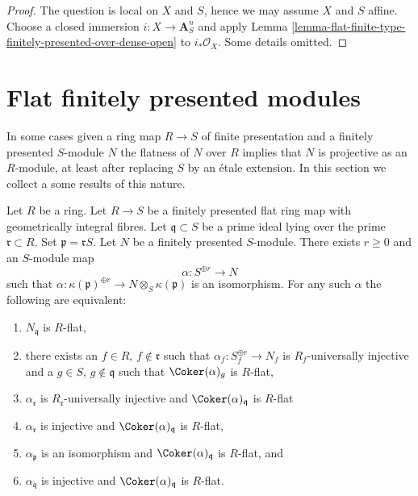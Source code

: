 \begin{proof}
The question is local on $X$ and $S$, hence we may assume $X$ and
$S$ affine. Choose a closed immersion $i : X \to \mathbf{A}^n_S$
and apply
Lemma \ref{lemma-flat-finite-type-finitely-presented-over-dense-open}
to $i_*\mathcal{O}_X$. Some details omitted.
\end{proof}





\section{Flat finitely presented modules}
\label{section-finitely-presented-flat}

\noindent
In some cases given a ring map $R \to S$ of finite presentation and
a finitely presented $S$-module $N$ the flatness of $N$ over $R$ implies
that $N$ is projective as an $R$-module, at least after replacing $S$
by an \'etale extension. In this section we collect a some results
of this nature.

\begin{lemma}
\label{lemma-induction-step-fp}
Let $R$ be a ring. Let $R \to S$ be a finitely presented
flat ring map with geometrically integral fibres. Let
$\mathfrak q \subset S$ be a prime ideal lying over the prime
$\mathfrak r \subset R$. Set $\mathfrak p = \mathfrak r S$.
Let $N$ be a finitely presented $S$-module.
There exists $r \geq 0$ and an $S$-module map
$$
\alpha : S^{\oplus r} \longrightarrow N
$$
such that
$\alpha : \kappa(\mathfrak p)^{\oplus r} \to N \otimes_S \kappa(\mathfrak p)$
is an isomorphism. For any such $\alpha$ the following are equivalent:
\begin{enumerate}
\item $N_{\mathfrak q}$ is $R$-flat,
\item there exists an $f \in R$, $f \not \in \mathfrak r$ such that
$\alpha_f : S_f^{\oplus r} \to N_f$ is $R_f$-universally injective and
a $g \in S$, $g \not \in \mathfrak q$ such that $\Coker(\alpha)_g$
is $R$-flat,
\item $\alpha_{\mathfrak r}$ is $R_{\mathfrak r}$-universally injective and
$\Coker(\alpha)_{\mathfrak q}$ is $R$-flat
\item $\alpha_{\mathfrak r}$ is injective and
$\Coker(\alpha)_{\mathfrak q}$ is $R$-flat,
\item $\alpha_{\mathfrak p}$ is an isomorphism and
$\Coker(\alpha)_{\mathfrak q}$ is $R$-flat, and
\item $\alpha_{\mathfrak q}$ is injective and
$\Coker(\alpha)_{\mathfrak q}$ is $R$-flat.
\end{enumerate}
\end{lemma}

